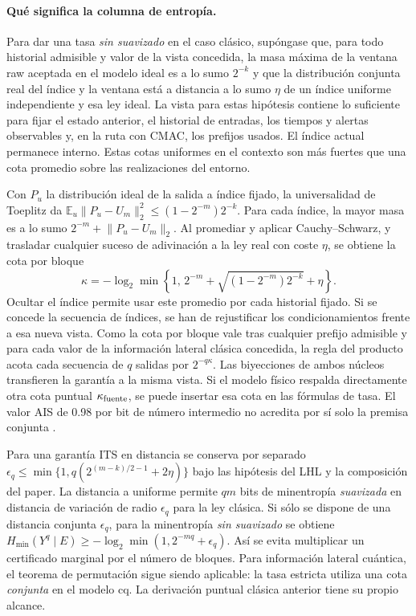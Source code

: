 \paragraph{Qué significa la columna de entropía.}
Para dar una tasa \emph{sin suavizado} en el caso clásico, supóngase que,
para todo historial admisible y valor de la vista concedida, la masa máxima
de la ventana raw aceptada en el modelo ideal es a lo sumo \(2^{-k}\) y
que la distribución conjunta real del índice y la ventana está a distancia
a lo sumo \(\eta\) de un índice uniforme independiente y esa ley ideal.
La vista para estas hipótesis contiene lo suficiente para fijar el estado
anterior, el historial de entradas, los tiempos y alertas observables y,
en la ruta con CMAC, los prefijos usados. El índice actual permanece interno.
Estas cotas uniformes en el contexto son más fuertes que una cota promedio
sobre las realizaciones del entorno.

Con \(P_u\) la distribución ideal de la salida a índice fijado, la
universalidad de Toeplitz da
\(\mathbb E_u\lVert P_u-U_m\rVert_2^2\le(1-2^{-m})2^{-k}\).
Para cada índice, la mayor masa es a lo sumo
\(2^{-m}+\lVert P_u-U_m\rVert_2\). Al promediar y aplicar
Cauchy--Schwarz, y trasladar cualquier suceso de adivinación a la ley real
con coste \(\eta\), se obtiene la cota por bloque
\[
 \kappa=-\log_2\min\!\left\{1,\,
 2^{-m}+\sqrt{(1-2^{-m})2^{-k}}+\eta\right\}.
\]
Ocultar el índice permite usar este promedio por cada historial fijado.
Si se concede la secuencia de índices, se han de rejustificar los
condicionamientos frente a esa nueva vista. Como la cota por bloque vale
tras cualquier prefijo admisible y para cada valor de la información
lateral clásica concedida, la regla del producto acota cada secuencia de
\(q\) salidas por \(2^{-q\kappa}\). Las biyecciones de ambos núcleos
transfieren la garantía a la misma vista. Si el modelo físico respalda
directamente otra cota puntual \(\kappa_{\rm fuente}\), se puede insertar
esa cota en las fórmulas de tasa. El valor AIS de 0.98 por bit de número
intermedio no acredita por sí solo la premisa conjunta
\cite[§§335,382 y 402]{ais}.

Para una garantía ITS en distancia se conserva por separado
\(\epsilon_q\le\min\{1,q(2^{(m-k)/2-1}+2\eta)\}\) bajo las
hipótesis del LHL y la composición del paper. La distancia a uniforme
permite \(qm\) bits de minentropía \emph{suavizada} en distancia de
variación de radio \(\epsilon_q\) para la ley clásica. Si sólo se dispone
de una distancia conjunta \(\epsilon_q\), para la minentropía
\emph{sin suavizado} se obtiene
\(H_{\min}(Y^q\mid E)\ge -\log_2\min(1,2^{-mq}+\epsilon_q)\).
Así se evita multiplicar un certificado marginal por el número de bloques.
Para información lateral cuántica, el teorema de permutación sigue siendo
aplicable: la tasa estricta utiliza una cota \emph{conjunta} en el modelo
cq. La derivación puntual clásica anterior tiene su propio alcance.

